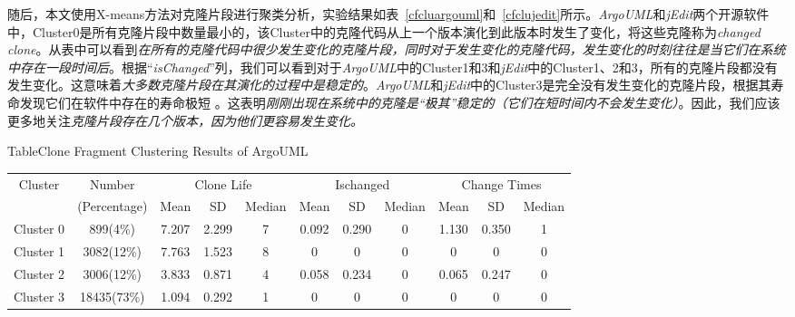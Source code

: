 随后，本文使用X-means方法对克隆片段进行聚类分析，实验结果如表~\ref{cfcluargouml}和~\ref{cfclujedit}所示。{\em ArgoUML}和{\em jEdit}两个开源软件中，Cluster0是所有克隆片段中数量最小的，该Cluster中的克隆代码从上一个版本演化到此版本时发生了变化，将这些克隆称为{\em changed clone}。从表中可以看到{\em 在所有的克隆代码中很少发生变化的克隆片段，同时对于发生变化的克隆代码，发生变化的时刻往往是当它们在系统中存在一段时间后}。根据``{\em isChanged}''列，我们可以看到对于{\em  ArgoUML}中的Cluster1和3和{\em  jEdit}中的Cluster1、2和3，所有的克隆片段都没有发生变化。这意味着{\em 大多数克隆片段在其演化的过程中是稳定的}。{\em ArgoUML}和{\em jEdit}中的Cluster3是完全没有发生变化的克隆片段，根据其寿命发现它们在软件中存在的寿命极短 。这表明{\em 刚刚出现在系统中的克隆是“极其”稳定的（它们在短时间内不会发生变化）}。因此，我们应该更多地关注{\em 克隆片段存在几个版本，因为他们更容易发生变化。}


\begin{table}[htbp]
{Table$\!$}{Clone Fragment Clustering Results of ArgoUML}
\vspace{0.5em}
\centering
\footnotesize
\begin{tabular}{ccccccccccc}
\toprule[1.5pt]
\multirow{2}{*}{Cluster}&{Number}&\multicolumn{3}{c}{Clone Life}&\multicolumn{3}{c}{Ischanged}&\multicolumn{3}{c}{Change Times} \\
&(Percentage)&{Mean}&SD &{Median}&{Mean}&SD &{Median}&{Mean}&SD &{Median}\\
\midrule[1pt]
Cluster 0&899(4\%)&7.207&2.299&7&0.092&0.290&0&1.130&0.350&1\\ 
Cluster 1&3082(12\%)&7.763&1.523&8&0&0&0	&0&0&0\\ 
Cluster 2&3006(12\%)&3.833&0.871&4&0.058&0.234&0	&0.065&0.247&0\\ 
Cluster 3&18435(73\%)&1.094&0.292&1	&0	&0	&0	&0	&0	&0\\ 
\bottomrule[1.5pt]
\end{tabular}
\end{table}

